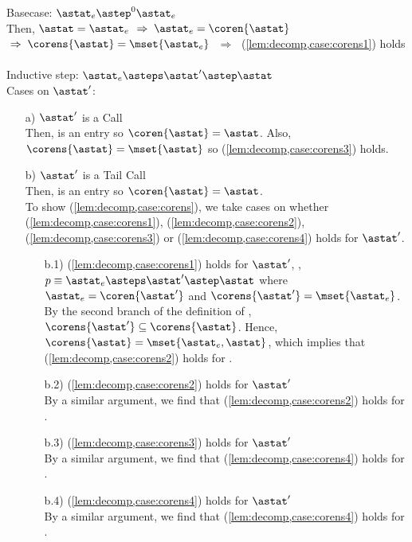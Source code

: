 \documentclass{LMCS}
\theoremstyle{definition} \newtheorem{property}[thm]{Property}
\begin{document}
Basecase: $\entry \astep^0 \entry$ \\
Then, $\astat = \entry$
$\;\Rightarrow\; \entry = \coren{\astat}$
$\;\Rightarrow\; \corens{\astat} = \mset{\entry}$
$\;\Rightarrow\;$ (\ref{lem:decomp,case:corens1}) holds \\
\\
Inductive step: $\entry \asteps \astat' \astep \astat$ \\
Cases on $\astat'$:
\begin{enumerate}[$\bullet$]
\item[a)]
  $\astat'$ is a Call \\
  Then, \astat{} is an entry so $\coren{\astat} = \astat$. 
  Also, $\corens{\astat} = \mset{\astat}$
  so (\ref{lem:decomp,case:corens3}) holds.
\item[b)]
  $\astat'$ is a Tail Call \\
  Then, \astat{} is an entry so $\coren{\astat} = \astat$. \\
  To show (\ref{lem:decomp,case:corens}), we take cases on whether 
  (\ref{lem:decomp,case:corens1}), (\ref{lem:decomp,case:corens2}),
  (\ref{lem:decomp,case:corens3}) or (\ref{lem:decomp,case:corens4})
  holds for $\astat'$.
  \begin{enumerate}[b.1]
  \item[b.1)]
    (\ref{lem:decomp,case:corens1}) holds for $\astat'$, \ie, \\
    $p \equiv \entry \asteps \astat' \astep \astat$ where
    $\entry = \coren{\astat'}$ and $\corens{\astat'} = \mset{\entry}$.
    By the second branch of the definition of \dcorens{},
    $\corens{\astat'} \subseteq \corens{\astat}$.
    Hence, $\corens{\astat} = \mset{\entry, \astat}$,
    which implies that (\ref{lem:decomp,case:corens2}) holds for \astat.
  \item[b.2)]
    (\ref{lem:decomp,case:corens2}) holds for $\astat'$ \\
    By a similar argument, 
    we find that (\ref{lem:decomp,case:corens2}) holds for \astat.
  \item[b.3)]
    (\ref{lem:decomp,case:corens3}) holds for $\astat'$ \\
    By a similar argument, 
    we find that (\ref{lem:decomp,case:corens4}) holds for \astat.
  \item[b.4)]
    (\ref{lem:decomp,case:corens4}) holds for $\astat'$ \\
    By a similar argument, 
    we find that (\ref{lem:decomp,case:corens4}) holds for \astat.
  \end{enumerate}

\end{enumerate}
\end{document}
